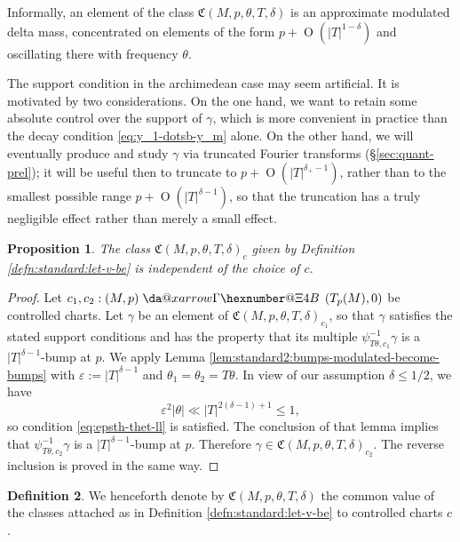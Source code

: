 \documentclass[reqno]{amsart}
\makeatletter
\newcommand*{\da@rightarrow}{\mathchar"0\hexnumber@\symAMSa 4B }
\newcommand*{\xdashrightarrow}[2][]{%
  \mathrel{%
    \mathpalette{\da@xarrow{#1}{#2}{}\da@rightarrow{\,}{}}{}%
  }%
}
\newcommand*{\da@xarrow}[7]{%
  \sbox0{$\ifx#7\scriptstyle\scriptscriptstyle\else\scriptstyle\fi#5#1#6\m@th$}%
  \sbox2{$\ifx#7\scriptstyle\scriptscriptstyle\else\scriptstyle\fi#5#2#6\m@th$}%
  \sbox4{$#7\dabar@\m@th$}%
  \dimen@=\wd0 %
  \ifdim\wd2 >\dimen@
    \dimen@=\wd2 %
  \fi
  \count@=2 %
  \def\da@bars{\dabar@\dabar@}%
  \@whiledim\count@\wd4<\dimen@\do{%
    \advance\count@\@ne
    \expandafter\def\expandafter\da@bars\expandafter{%
      \da@bars
      \dabar@ 
    }%
  }%
  \mathrel{#3}%
  \mathrel{%
    \mathop{\da@bars}\limits
    \ifx\\#1\\%
    \else
      _{\copy0}%
    \fi
    \ifx\\#2\\%
    \else
      ^{\copy2}%
    \fi
  }%
  \mathrel{#4}%
}
\def\eps{\varepsilon}
\def\O{\operatorname{O}}
\theoremstyle{plain} \newtheorem{theorem} {Theorem}
\newtheorem{proposition} [theorem] {Proposition}
\theoremstyle{definition} \newtheorem{definition} [theorem] {Definition}
\theoremstyle{itplain} %
\numberwithin{equation}{section}
\numberwithin{theorem}{section}
\renewcommand{\leq}{\leqslant}
\makeatother
\begin{document}
\begin{remark}
  Informally, an element of the class $\mathfrak{C}(M,p,\theta,T,\delta)$ is an approximate modulated delta mass, concentrated on elements of the form $p + \O(|T|^{1-\delta})$ and oscillating there with frequency $\theta$.
  
  The support condition in the archimedean case may seem artificial.  It is motivated by two considerations.  On the one hand, we want to retain some absolute control over the support of $\gamma$, which is more convenient in practice than the decay condition \eqref{eq:y_1-dotsb-y_m} alone.  On the other hand, we will eventually produce and study $\gamma$  via truncated Fourier transforms (\S\ref{sec:quant-prel}); it will be useful then to truncate to $p + \O(|T|^{\delta_+-1})$, rather than to the smallest possible range $p + \O(|T|^{\delta-1})$, so that the truncation has a truly negligible effect rather than merely a small effect.
\end{remark}

\begin{proposition}\label{lem:standard2:class-mathfrakcm-p}
  The class $\mathfrak{C}(M,p,\theta,T,\delta)_c$ given by Definition \ref{defn:standard:let-v-be} is independent of the choice of $c$.
\end{proposition}
\begin{proof}
  Let $c_1, c_2 : (M, p) \xdashrightarrow{} (T_p(M),0)$ be controlled charts.  Let $\gamma$ be an element of $\mathfrak{C}(M,p,\theta,T,\delta)_{c_1}$, so that $\gamma$ satisfies the stated support conditions and has the property that its multiple $\psi_{T \theta,c_1}^{-1} \gamma$ is a $|T|^{\delta-1}$-bump at $p$.  We apply Lemma \ref{lem:standard2:bumps-modulated-become-bumps} with $\eps := |T|^{\delta-1}$ and $\theta_1 = \theta_2 = T \theta$.  In view of our assumption $\delta \leq 1/2$, we have
  \begin{equation*}
    \eps^2 |\theta|  \ll |T|^{2 (\delta - 1) + 1} \leq 1,
  \end{equation*}
  so condition \ref{eq:epsth-thet-ll} is satisfied.  The conclusion of that lemma implies that $\psi_{T \theta, c_2}^{-1} \gamma$ is a $|T|^{\delta-1}$-bump at $p$.  Therefore $\gamma \in \mathfrak{C}(M,p,\theta,T,\delta)_{c_2}$.  The reverse inclusion is proved in the same way.
\end{proof}

\begin{definition}\label{defn:we-henceforth-denote}
  We henceforth denote by $\mathfrak{C}(M,p,\theta,T,\delta)$ the common value of the classes attached as in Definition \ref{defn:standard:let-v-be} to controlled charts $c$.
\end{definition}
\end{document}
